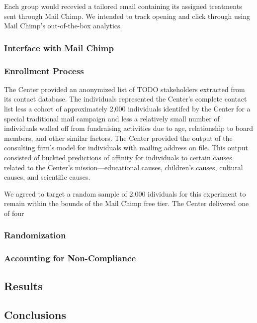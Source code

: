 \documentclass[]{article}
\begin{document}
Each group would recevied a tailored email containing its assigned
treatments sent through Mail Chimp. We intended to track opening and
click through using Mail Chimp's out-of-the-box analytics.

\subsubsection{Interface with Mail
Chimp}\label{interface-with-mail-chimp}

\subsubsection{Enrollment Process}\label{enrollment-process}

The Center provided an anonymized list of TODO stakeholders extracted
from its contact database. The individuals represented the Center's
complete contact list less a cohort of approximately 2,000 individuals
identifed by the Center for a special traditional mail campaign and less
a relatively small number of individuals walled off from fundraising
activities due to age, relationship to board members, and other similar
factors. The Center provided the output of the consulting firm's model
for individuals with mailing address on file. This output consisted of
buckted predictions of affinity for individuals to certain causes
related to the Center's mission---educational causes, children's causes,
cultural causes, and scientific causes.

We agreed to target a random sample of 2,000 idividuals for this
experiment to remain within the bounds of the Mail Chimp free tier. The
Center delivered one of four

\subsubsection{Randomization}\label{randomization}

\subsubsection{Accounting for
Non-Compliance}\label{accounting-for-non-compliance}

\subsection{Results}\label{results}

\subsection{Conclusions}\label{conclusions}
\end{document}
